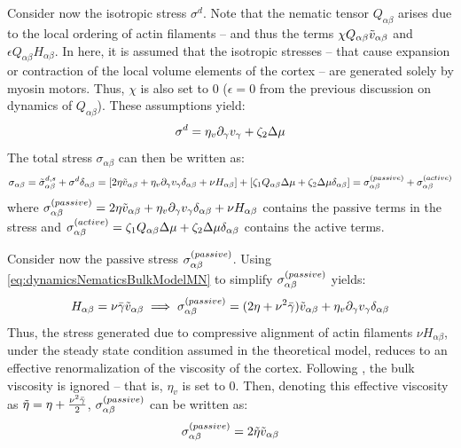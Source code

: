 Consider now the isotropic stress $\sigma^d$. Note that the nematic tensor $Q_{\alpha\beta}$ arises due to the local ordering of actin filaments -- and thus the terms $\chi Q_{\alpha\beta}\Tilde{v}_{\alpha\beta}$ and $\epsilon Q_{\alpha\beta} H_{\alpha\beta}$. In here, it is assumed that the isotropic stresses -- that cause expansion or contraction of the local volume elements of the cortex -- are generated solely by myosin motors. Thus, $\chi$ is also set to \num{0} ($\epsilon = \num{0}$ from the previous discussion on dynamics of $Q_{\alpha\beta}$). These assumptions yield:
\begin{equation}
    \sigma^d = \eta_v \inlinePartial{\gamma}{v_\gamma} + \zeta_2 \Delta\mu
\end{equation}
The total stress $\sigma_{\alpha\beta}$ can then be written as:
\begin{equation}
    \sigma_{\alpha\beta} = \Tilde{\sigma}^{d,s}_{\alpha\beta} + \sigma^d\delta_{\alpha\beta} = \left[2\eta \Tilde{v}_{\alpha\beta} + \eta_v \inlinePartial{\gamma}{v_\gamma}\delta_{\alpha\beta} + \nu H_{\alpha\beta}\right] + \left[\zeta_1 Q_{\alpha\beta}\Delta\mu + \zeta_2 \Delta\mu\delta_{\alpha\beta}\right] = \speciesSuper{\sigma}{passive}_{\alpha\beta} + \speciesSuper{\sigma}{active}_{\alpha\beta}
\end{equation}
where $\speciesSuper{\sigma}{passive}_{\alpha\beta} = 2\eta \Tilde{v}_{\alpha\beta} + \eta_v \inlinePartial{\gamma}{v_\gamma}\delta_{\alpha\beta} + \nu H_{\alpha\beta}$ contains the passive terms in the stress and $\sigma^{(active)}_{\alpha\beta} = \zeta_1 Q_{\alpha\beta}\Delta\mu + \zeta_2 \Delta\mu\delta_{\alpha\beta}$ contains the active terms. 

Consider now the passive stress $\sigma^{(passive)}_{\alpha\beta}$. Using \autoref{eq:dynamicsNematicsBulkModelMN} to simplify $\sigma^{(passive)}_{\alpha\beta}$ yields:
\begin{equation}
    H_{\alpha\beta} = \nu\bar{\gamma} \Tilde{v}_{\alpha\beta} \implies \speciesSuper{\sigma}{passive}_{\alpha\beta} = (2\eta +  \nu^2\bar{\gamma})\Tilde{v}_{\alpha\beta} + \eta_v \inlinePartial{\gamma}{v_\gamma}\delta_{\alpha\beta}
\end{equation}
Thus, the stress generated due to compressive alignment of actin filaments $\nu H_{\alpha\beta}$, under the steady state condition assumed in the theoretical model, reduces to an effective renormalization of the viscosity of the cortex. Following \citep{gross2019guiding}, the bulk viscosity is ignored -- that is, $\eta_v$ is set to \num{0}. Then, denoting this effective viscosity as $\Tilde{\eta} = \eta + \frac{\nu^2\bar{\gamma}}{2}$, $\sigma^{(passive)}_{\alpha\beta}$ can be written as:
\begin{equation}
    \sigma^{(passive)}_{\alpha\beta} = 2\Tilde{\eta}\Tilde{v}_{\alpha\beta}
\end{equation}

